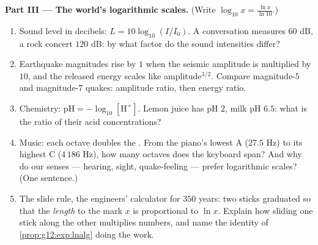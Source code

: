 \begin{problem}
\medskip
\noindent\textbf{Part III --- The world's logarithmic scales.}
(Write $\log_{10} x = \frac{\ln x}{\ln 10}$.)
\begin{enumerate}[resume]
  \item Sound level in decibels: $L = 10 \log_{10}(I/I_0)$. A
        conversation measures $60$ dB, a rock concert $120$ dB:
        by what factor do the sound intensities differ?
  \item Earthquake magnitudes rise by $1$ when the seismic
        amplitude is multiplied by $10$, and the released
        energy scales like amplitude$^{3/2}$. Compare
        magnitude-$5$ and magnitude-$7$ quakes: amplitude
        ratio, then energy ratio.
  \item Chemistry: $\text{pH} = -\log_{10}[\mathrm{H^+}]$.
        Lemon juice has pH $2$, milk pH $6.5$: what is the
        ratio of their acid concentrations?
  \item Music: each octave doubles the . From the
        piano's lowest A ($27.5$ Hz) to its highest C
        ($4\,186$ Hz), how many octaves does the keyboard span?
        And why do our senses --- hearing, sight, quake-feeling
        --- prefer logarithmic scales? (One sentence.)
  \item The slide rule, the engineers' calculator for $350$
        years: two sticks graduated so that the \emph{length}
        to the mark $x$ is proportional to $\ln x$. Explain how
        sliding one stick along the other multiplies numbers,
        and name the identity of
        \cref{prop:g12:exp:lnalg} doing the work.
\end{enumerate}


\end{problem}
